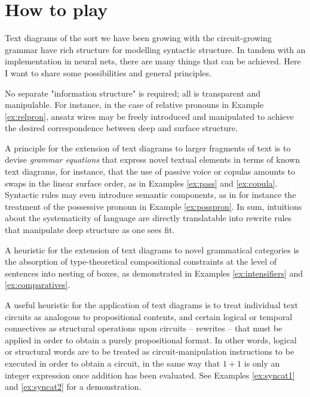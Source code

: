 \section{How to play}

Text diagrams of the sort we have been growing with the circuit-growing grammar have rich structure for modelling syntactic structure. In tandem with an implementation in neural nets, there are many things that can be achieved. Here I want to share some possibilities and general principles.

 No separate "information structure" is required; all is transparent and manipulable. For instance, in the case of relative pronouns in Example \ref{ex:relpron}, ansatz wires may be freely introduced and manipulated to achieve the desired correspondence between deep and surface structure.

 A principle for the extension of text diagrams to larger fragments of text is to devise \emph{grammar equations} \citep{coeckeGrammarEquations2021a} that express novel textual elements in terms of known text diagrams, for instance, that the use of passive voice or copulas amounts to swaps in the linear surface order, as in Examples \ref{ex:pass} and \ref{ex:copula}. Syntactic rules may even introduce semantic components, as in for instance the treatment of the possessive pronoun in Example \ref{ex:posspron}. In sum, intuitions about the systematicity of language are directly translatable into rewrite rules that manipulate deep structure as one sees fit.

 A heuristic for the extension of text diagrams to novel grammatical categories is the absorption of type-theoretical compositional constraints at the level of sentences into nesting of boxes, as demonstrated in Examples \ref{ex:intensifiers} and \ref{ex:comparatives}.

 A useful heuristic for the application of text diagrams is to treat individual text circuits as analogous to propositional contents, and certain logical or temporal connectives as structural operations upon circuits -- rewrites -- that must be applied in order to obtain a purely propositional format. In other words, logical or structural words are to be treated as circuit-manipulation instructions to be executed in order to obtain a circuit, in the same way that $1 + 1$ is only an integer expression once addition has been evaluated. See Examples \ref{ex:syncat1} and \ref{ex:syncat2} for a demonstration.

